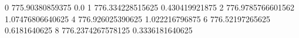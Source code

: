 0 775.90380859375 0.0
1 776.334228515625 0.430419921875
2 776.9785766601562 1.07476806640625
4 776.926025390625 1.022216796875
6 776.52197265625 0.6181640625
8 776.2374267578125 0.3336181640625
